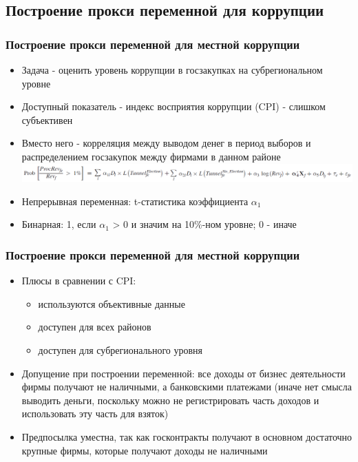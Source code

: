 \subsection{Построение прокси переменной для коррупции}

\begin{frame}
\frametitle{Построение прокси переменной для местной коррупции}
	\begin{itemize}
		\item Задача - оценить уровень коррупции в госзакупках на субрегиональном уровне
		\item Доступный показатель - индекс восприятия коррупции (CPI) - слишком субъективен
		\item Вместо него - корреляция между выводом денег в период выборов и распределением госзакупок
		 между фирмами в данном районе
		\includegraphics[scale=0.3]{images/kek1}
		\item Непрерывная переменная: t-статистика коэффициента $\alpha_1$
		\item Бинарная: 1, если $\alpha_1$ > 0 и значим на 10\%-ном уровне; 0 - иначе
	\end{itemize}
\end{frame}


\begin{frame}
\frametitle{Построение прокси переменной для местной коррупции}
	\begin{itemize}
		\item Плюсы в сравнении с CPI: 
		\begin{itemize}
			\item используются объективные данные
			\item доступен для всех районов
			\item доступен для субрегионального уровня
		\end{itemize} 
		\item Допущение при построении переменной: все доходы от бизнес деятельности фирмы получают не наличными, а банковскими платежами (иначе нет смысла выводить деньги, поскольку можно не регистрировать часть доходов и использовать эту часть для взяток)
		\item Предпосылка уместна, так как госконтракты получают в основном достаточно крупные фирмы, которые получают доходы не наличными 
	\end{itemize}
\end{frame}

